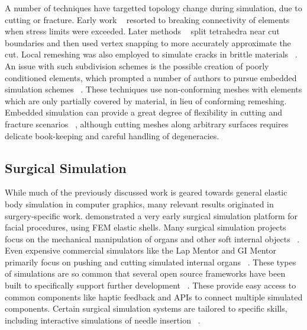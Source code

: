 A number of techniques have targetted topology change during
simulation, due to cutting or fracture. Early work ~\citep{TerzoF:1988b}
resorted to breaking connectivity of elements when stress limits were
exceeded. Later methods ~\citep{NienhS:2001} split tetrahedra near cut
boundaries and then used vertex snapping to more accurately
approximate the cut. Local remeshing was also employed to simulate
cracks in brittle materials ~\citep{OBriH:1999}. An issue with such
subdivision schemes is the possible creation of poorly conditioned
elements, which prompted a number of authors to pursue embedded
simulation schemes ~\citep{MolinBF:2004,TeranSBNLF:2005}. These
techniques use non-conforming meshes with elements which are only
partially covered by material, in lieu of conforming
remeshing. Embedded simulation can provide a great degree of
flexibility in cutting and fracture scenarios ~\citep{SifakDF:2007},
although cutting meshes along arbitrary surfaces requires delicate
book-keeping and careful handling of degeneracies.


\subsection{Surgical Simulation}
While much of the previously discussed work is geared towards general
elastic body simulation in computer graphics, many relevant results
originated in surgery-specific work. 
\citet{PiepeLR:1995} demonstrated a very early surgical simulation
platform for facial procedures, using FEM elastic shells.  Many
surgical simulation projects focus on the mechanical manipulation of
organs and other soft internal objects
~\citep{NienhS:2001,KimCDS:2007}. Even expensive commercial simulators
like the Lap Mentor and GI Mentor primarily focus on pushing and
cutting simulated internal organs
~\citep{SUSAC:2002--2014b,SUSAC:2002--2014}. These types of simulations
are so common that several open source frameworks have been built to
specifically support further development
~\citep{AllarCFBPDDGo:2007,CavusGT:2006}. These provide easy access to
common components like haptic feedback and APIs to connect multiple
simulated components. Certain surgical simulation systems are tailored
to specific skills, including interactive simulations of needle
insertion ~\citep{ChentARCHGSO:2009}.

